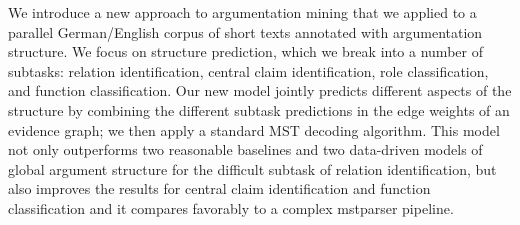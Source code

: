 We introduce a new approach to argumentation mining that we applied to a parallel German/English corpus of short texts annotated with argumentation structure. We focus on structure prediction, which we break into a number of subtasks: relation identification, central claim identification, role classification, and function classification. Our new model jointly predicts different aspects of the structure by combining the different subtask predictions in the edge weights of an evidence graph; we then apply a standard MST decoding algorithm. This model not only outperforms two reasonable baselines and two data-driven models of global argument structure for the difficult subtask of relation identification, but also improves the results for central claim identification and function classification and it compares favorably to a complex mstparser pipeline.
